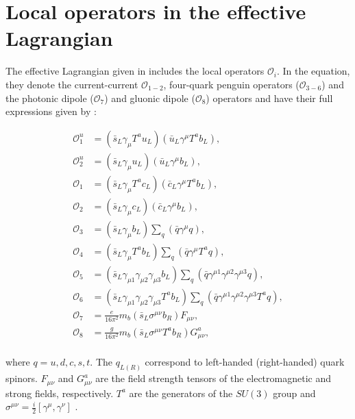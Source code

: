 \chapter{Local operators in the effective Lagrangian}\label{sec:appendix_local_opperators}
The effective Lagrangian given in  includes the local operators $\mathcal{O}_i$.
In the equation, they denote the current-current $\mathcal{O}_{1-2}$, four-quark penguin operators ($\mathcal{O}_{3-6}$) and the photonic dipole ($\mathcal{O}_{7}$) and gluonic dipole ($\mathcal{O}_{8}$) operators \cite{Misiak:2015xwa} and have their full expressions given by \cite{Kaminski:2012eb,Chetyrkin:1996vx}:

\begin{align*}
    \mathcal{O}_1^u & = (\bar{s}_L\gamma_\mu T^a u_L)(\bar{u}_L\gamma^\mu T^a b_L), \\
    \mathcal{O}_2^u & = (\bar{s}_L\gamma_\mu u_L)(\bar{u}_L\gamma^\mu b_L),\\ 
    \mathcal{O}_1 &   = (\bar{s}_L\gamma_\mu T^a c_L)(\bar{c}_L\gamma^\mu T^a b_L),\\ 
    \mathcal{O}_2 &   = (\bar{s}_L\gamma_\mu c_L)(\bar{c}_L\gamma^\mu b_L),\\ 
    \mathcal{O}_3 &   = (\bar{s}_L\gamma_\mu b_L)\sum_q(\bar{q}\gamma^{\mu}q),\\ 
    \mathcal{O}_4 &   = (\bar{s}_L\gamma_\mu T^a b_L)\sum_q(\bar{q}\gamma^{\mu}T^a q),\\ 
    \mathcal{O}_5 &   = (\bar{s}_L\gamma_{\mu 1}\gamma_{\mu 2}\gamma_{\mu 3}  b_L)\sum_q(\bar{q}\gamma^{\mu 1}\gamma^{\mu 2}\gamma^{\mu 3} q),\\
    \mathcal{O}_6 &   = (\bar{s}_L\gamma_{\mu 1}\gamma_{\mu 2}\gamma_{\mu 3} T^a b_L)\sum_q(\bar{q}\gamma^{\mu 1}\gamma^{\mu 2}\gamma^{\mu 3}T^a q),\\
    \mathcal{O}_7 &   =  \frac{e}{16\pi^2}m_b(\bar{s}_L\sigma^{\mu\nu}b_R)F_{\mu\nu},\\ 
    \mathcal{O}_8 &   =  \frac{g}{16\pi^2}m_b(\bar{s}_L\sigma^{\mu\nu}T^a b_R)G^a_{\mu\nu},\\ 
\end{align*}

where $q=u,d,c,s,t$. The $q_{L(R)}$ correspond to left-handed (right-handed) quark spinors.
$F_{\mu\nu}$ and $G^a_{\mu\nu}$ are the field strength tensors of the electromagnetic and strong fields, respectively.
$T^a$ are the generators of the $SU(3)$ group and $\sigma^{\mu\nu}=\frac{i}{2}[\gamma^{\mu},\gamma^{\nu}]$ \cite{Peskin:1995ev}.
